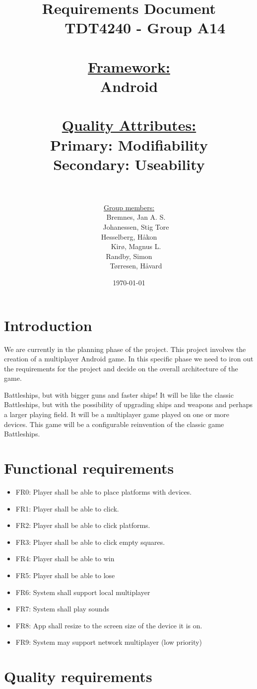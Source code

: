 \documentclass[12pt, a4paper]{article}
\title{
	Requirements Document \\
    TDT4240 - Group A14 \\
	\\
	\normalsize{
	\underline{Framework:} \\ 
	Android\\
    \\
	\underline{Quality Attributes:} \\
	Primary: Modifiability \\
	Secondary: Useability \\ 
    \\
	}
}
\author{
	\underline{Group members:} \\
    Bremnes, Jan A. S.\\
    Johanessen, Stig Tore\\
	Hesselberg, Håkon \\
    Kirø, Magnus L.\\
	Randby, Simon \\
    Tørresen, Håvard\\
}
\date{\today}
\begin{document}
\maketitle
{}

\newpage
\tableofcontents
\newpage

\section{Introduction}
We are currently in the planning phase of the project. This project involves the creation of a multiplayer Android game. In this specific phase we need to iron out the requirements for the project and decide on the overall architecture of the game.

Battleships, but with bigger guns and faster ships! It will be like the classic Battleships, but with the possibility of upgrading ships and weapons and perhaps a larger playing field. It will be a multiplayer game played on one or more devices.
This game will be a configurable reinvention of the classic game Battleships.


\section{Functional requirements}
\begin{itemize}
\item FR0: Player shall be able to place platforms with devices.
\item FR1: Player shall be able to click.
\item FR2: Player shall be able to click platforms.
\item FR3: Player shall be able to click empty squares. 
\item FR4: Player shall be able to win 
\item FR5: Player shall be able to lose
\item FR6: System shall support local multiplayer
\item FR7: System shall play sounds
\item FR8: App shall resize to the screen size of the device it is on.
\item FR9: System may support network multiplayer (low priority)
\end{itemize}

\section{Quality requirements}
\end{document}

